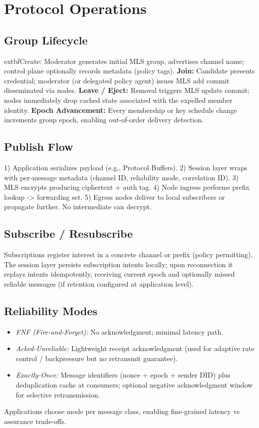 \documentclass{article}
\theoremstyle{definition}
\theoremstyle{remark}
\begin{document}
\section{Protocol Operations}\label{sec:operations}
\subsection{Group Lifecycle}
	extbf{Create:} Moderator generates initial MLS group, advertises channel name; control plane optionally records metadata (policy tags). \textbf{Join:} Candidate presents credential; moderator (or delegated policy agent) issues MLS add commit disseminated via nodes. \textbf{Leave / Eject:} Removal triggers MLS update commit; nodes immediately drop cached state associated with the expelled member identity. \textbf{Epoch Advancement:} Every membership or key schedule change increments group epoch, enabling out-of-order delivery detection.
\subsection{Publish Flow}
1) Application serializes payload (e.g., Protocol Buffers). 2) Session layer wraps with per-message metadata (channel ID, reliability mode, correlation ID). 3) MLS encrypts producing ciphertext + auth tag. 4) Node ingress performs prefix lookup -> forwarding set. 5) Egress nodes deliver to local subscribers or propagate further. No intermediate can decrypt.
\subsection{Subscribe / Resubscribe}
Subscriptions register interest in a concrete channel or prefix (policy permitting). The session layer persists subscription intents locally; upon reconnection it replays intents idempotently, receiving current epoch and optionally missed reliable messages (if retention configured at application level).
\subsection{Reliability Modes}
\begin{itemize}[leftmargin=*]
  \item \emph{FNF (Fire-and-Forget):} No acknowledgment; minimal latency path.
  \item \emph{Acked-Unreliable:} Lightweight receipt acknowledgment (used for adaptive rate control / backpressure but no retransmit guarantee).
  \item \emph{Exactly-Once:} Message identifiers (nonce + epoch + sender DID) plus deduplication cache at consumers; optional negative acknowledgment window for selective retransmission.
\end{itemize}
Applications choose mode per message class, enabling fine-grained latency vs assurance trade-offs.
\end{document}
